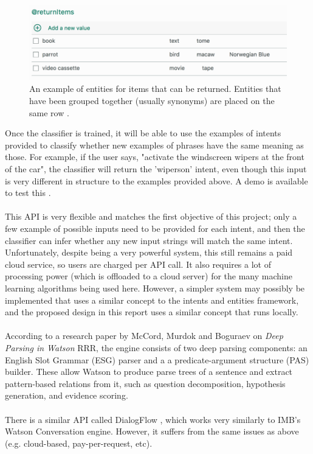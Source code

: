 \documentclass[12pt]{article}
\begin{document}
\begin{center}
\begin{figure}[H]
  \includegraphics[width=\textwidth]{returnitems.png}
  \caption{An example of entities for items that can be returned. Entities that have been grouped together (usually synonyms) are placed on the same row \cite{RefWorks:34}.}
\end{figure}
\end{center}
Once the classifier is trained, it will be able to use the examples of intents provided to classify whether new examples of phrases have the same meaning as those. For example, if the user says, "activate the windscreen wipers at the front of the car", the classifier will return the 'wipers\textunderscore on' intent, even though this input is very different in structure to the examples provided above. A demo is available to test this \cite{RefWorks:32}.
\\
\\
This API is very flexible and matches the first objective of this project; only a few example of possible inputs need to be provided for each intent, and then the classifier can infer whether any new input strings will match the same intent. Unfortunately, despite being a very powerful system, this still remains a paid cloud service, so users are charged per API call. It also requires a lot of processing power (which is offloaded to a cloud server) for the many machine learning algorithms being used here. However, a simpler system may possibly be implemented that uses a similar concept to the intents and entities framework, and the proposed design in this report uses a similar concept that runs locally.
\\
\\
According to a research paper by McCord, Murdok and Boguraev on \textit{Deep Parsing in Watson} RRR, the engine consists of two deep parsing components: an English Slot Grammar (ESG) parser and a a predicate-argument structure (PAS) builder. These allow Watson to produce parse trees of a sentence and extract pattern-based relations from it, such as question decomposition, hypothesis generation, and evidence scoring.
\\
\\
There is a similar API called DialogFlow \cite{RefWorks:106}, which works very similarly to IMB's Watson Conversation engine. However, it suffers from the same issues as above (e.g. cloud-based, pay-per-request, etc).
\end{document}
